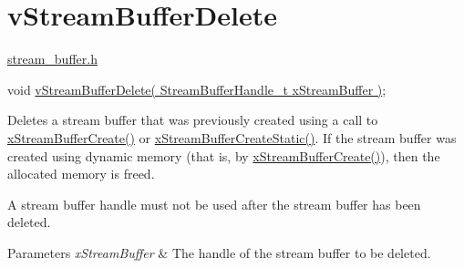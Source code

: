 \hypertarget{group__v_stream_buffer_delete}{}\section{v\+Stream\+Buffer\+Delete}
\label{group__v_stream_buffer_delete}
\hyperlink{stream__buffer_8h}{stream\+\_\+buffer.\+h}


\begin{DoxyPre}
void \hyperlink{stream__buffer_8h_a05dc9d2ae220a050526a062eddf6d7a2}{vStreamBufferDelete( StreamBufferHandle\_t xStreamBuffer )};
\end{DoxyPre}


Deletes a stream buffer that was previously created using a call to \hyperlink{stream__buffer_8h_a39aa4dd8b83e2df7ded291f863fb5fed}{x\+Stream\+Buffer\+Create()} or \hyperlink{stream__buffer_8h_a3c248575ac1b83801db605b32a118f77}{x\+Stream\+Buffer\+Create\+Static()}. If the stream buffer was created using dynamic memory (that is, by \hyperlink{stream__buffer_8h_a39aa4dd8b83e2df7ded291f863fb5fed}{x\+Stream\+Buffer\+Create()}), then the allocated memory is freed.

A stream buffer handle must not be used after the stream buffer has been deleted.


\begin{DoxyParams}{Parameters}
{\em x\+Stream\+Buffer} & The handle of the stream buffer to be deleted. \\
\hline
\end{DoxyParams}
